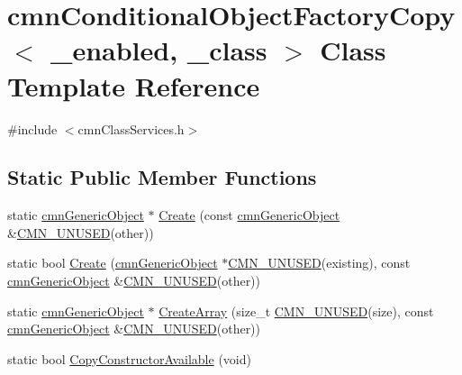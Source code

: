 \hypertarget{classcmn_conditional_object_factory_copy}{}\section{cmn\+Conditional\+Object\+Factory\+Copy$<$ \+\_\+enabled, \+\_\+class $>$ Class Template Reference}
\label{classcmn_conditional_object_factory_copy}


{\ttfamily \#include $<$cmn\+Class\+Services.\+h$>$}

\subsection*{Static Public Member Functions}
\begin{DoxyCompactItemize}
\item 
static \hyperlink{classcmn_generic_object}{cmn\+Generic\+Object} $\ast$ \hyperlink{classcmn_conditional_object_factory_copy_af550d5e1d54b9d1ba41453f21b919714}{Create} (const \hyperlink{classcmn_generic_object}{cmn\+Generic\+Object} \&\hyperlink{cmn_portability_8h_a021894e2626935fa2305434b1e893ff6}{C\+M\+N\+\_\+\+U\+N\+U\+S\+E\+D}(other))
\item 
static bool \hyperlink{classcmn_conditional_object_factory_copy_a5a64f02f150726ba877f6c439b77c600}{Create} (\hyperlink{classcmn_generic_object}{cmn\+Generic\+Object} $\ast$\hyperlink{cmn_portability_8h_a021894e2626935fa2305434b1e893ff6}{C\+M\+N\+\_\+\+U\+N\+U\+S\+E\+D}(existing), const \hyperlink{classcmn_generic_object}{cmn\+Generic\+Object} \&\hyperlink{cmn_portability_8h_a021894e2626935fa2305434b1e893ff6}{C\+M\+N\+\_\+\+U\+N\+U\+S\+E\+D}(other))
\item 
static \hyperlink{classcmn_generic_object}{cmn\+Generic\+Object} $\ast$ \hyperlink{classcmn_conditional_object_factory_copy_a9660cf5631b998882a36160c255f4218}{Create\+Array} (size\+\_\+t \hyperlink{cmn_portability_8h_a021894e2626935fa2305434b1e893ff6}{C\+M\+N\+\_\+\+U\+N\+U\+S\+E\+D}(size), const \hyperlink{classcmn_generic_object}{cmn\+Generic\+Object} \&\hyperlink{cmn_portability_8h_a021894e2626935fa2305434b1e893ff6}{C\+M\+N\+\_\+\+U\+N\+U\+S\+E\+D}(other))
\item 
static bool \hyperlink{classcmn_conditional_object_factory_copy_a93338467fa8ae3e034b0fe0fe4c38c5e}{Copy\+Constructor\+Available} (void)
\end{DoxyCompactItemize}


